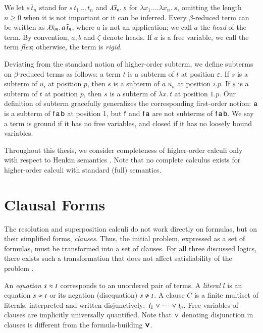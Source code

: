 We let $s \, \overline{t}_n$ stand for $s \, t_1 \, \ldots \, t_n$
and $\lambda \overline{x}_n.\> s$ for $\lambda x_1. \ldots \lambda x_n. \> s$,
omitting the length $n \geq 0$ when it is not important or it can be inferred. Every
$\beta$-reduced term can be written as $\lambda \overline{x}_{m}.\> a \, \overline{t}_{n}$,
where $a$ is not an application; we call $a$ the \emph{head} of the term. By
convention, $a, b$ and $\zeta$ denote heads. If $a$ is a free variable, we call the term
\emph{flex}; otherwise, the term is \emph{rigid}.

Deviating from the standard notion of higher-order subterm, we define subterms
on $\beta$-reduced terms as follows: a term $t$ is a subterm of $t$ at position
$\varepsilon$. If $s$ is a subterm of $u_i$ at position $p$, then $s$ is a
subterm of $a\;\overline{u}_n$ at position $i.p$. If $s$ is a subterm of $t$ at
position $p$, then $s$ is a subterm of $\lambda x.\, t$ at position $1.p$. Our
definition of subterm gracefully generalizes the corresponding first-order
notion: $\mathsf{a}$ is a subterm of $\mathsf{f} \, \mathsf{a} \, \mathsf{b}$ at position 1,
but $\mathsf{f}$ and $\mathsf{f} \, \mathsf{a}$ are not subterms of $\mathsf{f} \, \mathsf{a}
\, \mathsf{b}$. We say a term is ground if it has no free variables, and closed
if it has no loosely bound variables.


Throughout this thesis, we consider completeness of higher-order calculi only
with respect to Henkin semantics \cite{bm-14-automation-ho}. Note that no
complete calculus exists for higher-order calculi with standard (full)
semantics.

\section{Clausal Forms}
\label{sec:pre:clauses}

The resolution and superposition calculi do not work directly on formulas, but
on their simplified forms, {\em clauses}. Thus, the initial problem, expressed as a
set of formulas, must be transformed into a set of clauses. For all three
discussed logics, there exists such a transformation that does not affect
satisfiability of the problem \cite{nw-01-small-cnf}.

An {\em equation} $s \approx t$ corresponds to an unordered pair of terms. A {\em literal} $l$ is an equation $s \approx t$ or its negation (disequation) $s \noteq t$. A clause $C$ is a
finite multiset of literals, interpreted and written disjunctively:\ $l_1 \mathrel\lor
\cdots \mathrel\lor l_n$. Free variables of clauses are implicitly
universally quantified. Note that $\mathrel\lor$ denoting disjunction in clauses
is different from the formula-building $\pmb\lor$.

